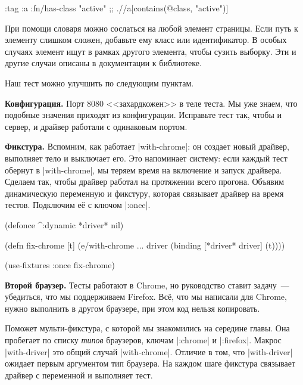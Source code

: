 \begin{english}
  \begin{clojure}
{:tag :a :fn/has-class "active"}
;; .//a[contains(@class, "active")]
  \end{clojure}
\end{english}

При помощи словаря можно сослаться на любой элемент страницы. Если путь к
элементу слишком сложен, добавьте ему класс или идентификатор. В особых случаях
элемент ищут в рамках другого элемента, чтобы сузить выборку. Эти и другие
случаи описаны в документации к библиотеке.

Наш тест можно улучшить по следующим пунктам.

\textbf{Конфигурация.} Порт 8080 <<захардкожен>> в теле теста. Мы уже знаем, что
подобные значения приходят из конфигурации. Исправьте тест так, чтобы и сервер,
и драйвер работали с одинаковым портом.


\textbf{Фикстура.} Вспомним, как работает \spverb|with-chrome|: он создает новый
драйвер, выполняет тело и выключает его. Это напоминает систему: если каждый
тест обернут в \spverb|with-chrome|, мы теряем время на включение и запуск
драйвера. Сделаем так, чтобы драйвер работал на протяжении всего
прогона. Объявим динамическую переменную и фикстуру, которая связывает драйвер
на время тестов. Подключим е\"{е} с ключом \spverb|:once|.

\begin{english}
  \begin{clojure}
(defonce ^:dynamic *driver* nil)

(defn fix-chrome [t]
  (e/with-chrome {...} driver
    (binding [*driver* driver]
      (t))))

(use-fixtures :once fix-chrome)
  \end{clojure}
\end{english}

\textbf{Второй браузер.} Тесты работают в Chrome, но руководство ставит
задачу~--- убедиться, что мы поддерживаем Firefox. Вс\"{е}, что мы написали для
Chrome, нужно выполнить в другом браузере, при этом код нельзя копировать.

Поможет мульти-фикстура, с которой мы знакомились на середине главы. Она
пробегает по списку \emph{типов} браузеров, ключам \spverb|:chrome| и
\spverb|:firefox|. Макрос \spverb|with-driver| это общий случай
\spverb|with-chrome|. Отличие в том, что \spverb|with-driver| ожидает первым
аргументом тип браузера. На каждом шаге фикстура связывает драйвер с переменной
и выполняет тест.

